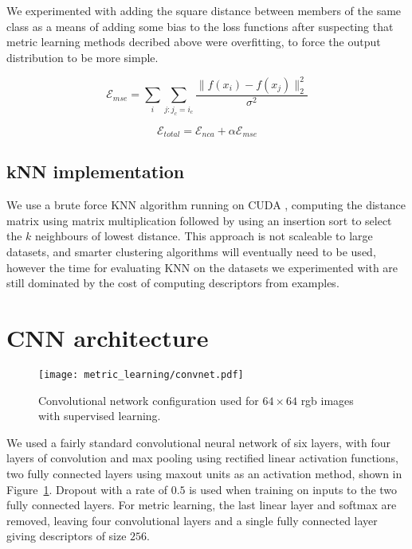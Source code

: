 We experimented with adding the square distance between members of the same class as a means of adding some bias to the loss functions after suspecting that metric learning methods decribed above were overfitting, to force the output distribution to be more simple. 

\begin{equation}
\label{eqn:mse}
\mathcal{E}_{mse} = \sum_i{ \sum_{j:j_c = i_c}  \frac {{\lVert f(x_i) - f(x_j) \rVert^2_2}} {\sigma^2} }
\end{equation}

\begin{equation}
\label{eqn:mse_total}
\mathcal{E}_{total} =  \mathcal{E}_{nca} + \alpha \mathcal{E}_{mse}
\end{equation}


\subsection {kNN implementation}

We use a brute force \gls{KNN} algorithm running on CUDA \cite{Garcia2008}, computing the distance matrix using matrix multiplication followed by using an insertion sort to select the $ k $ neighbours of lowest distance. This approach is not scaleable to large datasets, and smarter clustering algorithms will eventually need to be used, however the time for evaluating \gls{KNN} on the datasets we experimented with are still dominated by the cost of computing descriptors from examples. 


\section {CNN architecture}


\begin{figure}[ht]
\centering
\texttt{[image: metric\_learning/convnet.pdf]}
\caption{Convolutional network configuration used for $64\times64$ rgb images with supervised learning.}
\label{fig:metric_convnet}
\end{figure}

We used a fairly standard convolutional neural network of six layers, with four layers of convolution and max pooling using rectified linear activation functions, two fully connected layers using maxout \cite{Springenberg2013} units as an activation method, shown in Figure~\ref{fig:metric_convnet}. Dropout \cite{HintonDropout} with a rate of $ 0.5 $ is used when training on inputs to the two fully connected layers. For metric learning, the last linear layer and softmax are removed, leaving four convolutional layers and a single fully connected layer giving descriptors of size $ 256 $.

